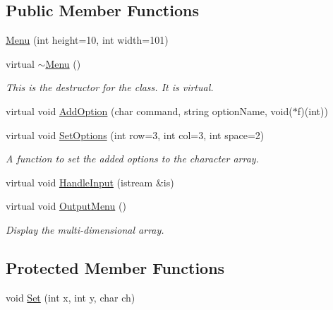 \subsection*{Public Member Functions}
\begin{DoxyCompactItemize}
\item 
\hyperlink{classMenu_a28ea9cee39d242905df93e6baa1544ea}{Menu} (int height=10, int width=101)
\item 
\hypertarget{classMenu_a831387f51358cfb88cd018e1777bc980}{virtual \hyperlink{classMenu_a831387f51358cfb88cd018e1777bc980}{$\sim$\-Menu} ()}\label{classMenu_a831387f51358cfb88cd018e1777bc980}

\begin{DoxyCompactList}\small\item\em This is the destructor for the class. It is virtual. \end{DoxyCompactList}\item 
virtual void \hyperlink{classMenu_acf8df478bd7cf4d6d4ad842f3b0f74b9}{Add\-Option} (char command, string option\-Name, void($\ast$f)(int))
\item 
\hypertarget{classMenu_acc31e14c9ed4dd2fb5dc4319738bafba}{virtual void \hyperlink{classMenu_acc31e14c9ed4dd2fb5dc4319738bafba}{Set\-Options} (int row=3, int col=3, int space=2)}\label{classMenu_acc31e14c9ed4dd2fb5dc4319738bafba}

\begin{DoxyCompactList}\small\item\em A function to set the added options to the character array. \end{DoxyCompactList}\item 
virtual void \hyperlink{classMenu_aebc8f6c5b80202603b45da16dc978706}{Handle\-Input} (istream \&is)
\item 
\hypertarget{classMenu_a4665a914fe24a8b11d8d6c95792184b3}{virtual void \hyperlink{classMenu_a4665a914fe24a8b11d8d6c95792184b3}{Output\-Menu} ()}\label{classMenu_a4665a914fe24a8b11d8d6c95792184b3}

\begin{DoxyCompactList}\small\item\em Display the multi-\/dimensional array. \end{DoxyCompactList}\end{DoxyCompactItemize}
\subsection*{Protected Member Functions}
\begin{DoxyCompactItemize}
\item 
void \hyperlink{classMenu_aa13913062e78fbd036ca698e0c0c5038}{Set} (int x, int y, char ch)
\end{DoxyCompactItemize}

